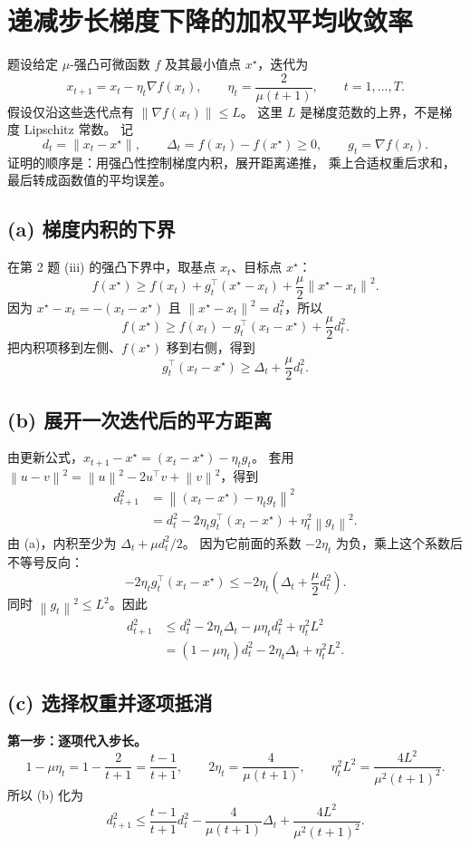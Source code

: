 \documentclass[UTF8,a4paper,11pt,fontset=fandol]{ctexart}
\newcommand{\norm}[1]{\left\lVert#1\right\rVert}
\begin{document}
\section{递减步长梯度下降的加权平均收敛率}
题设给定 $\mu$-强凸可微函数 $f$ 及其最小值点 $x^\star$，迭代为
\[
 x_{t+1}=x_t-\eta_t\nabla f(x_t),\qquad
 \eta_t=\frac2{\mu(t+1)},\qquad t=1,\ldots,T.
\]
假设仅沿这些迭代点有 $\norm{\nabla f(x_t)}\leq L$。
这里 $L$ 是梯度范数的上界，不是梯度 Lipschitz 常数。
记
\[
 d_t=\norm{x_t-x^\star},\qquad
 \Delta_t=f(x_t)-f(x^\star)\geq0,
 \qquad g_t=\nabla f(x_t).
\]
证明的顺序是：用强凸性控制梯度内积，展开距离递推，
乘上合适权重后求和，最后转成函数值的平均误差。

\subsection*{(a) 梯度内积的下界}
在第 2 题 (iii) 的强凸下界中，取基点 $x_t$、目标点 $x^\star$：
\[
 f(x^\star)\geq f(x_t)+g_t^\top(x^\star-x_t)
 +\frac\mu2\norm{x^\star-x_t}^2.
\]
因为 $x^\star-x_t=-(x_t-x^\star)$ 且
$\norm{x^\star-x_t}^2=d_t^2$，所以
\[
 f(x^\star)\geq f(x_t)-g_t^\top(x_t-x^\star)+\frac\mu2d_t^2.
\]
把内积项移到左侧、$f(x^\star)$ 移到右侧，得到
\[
 \boxed{g_t^\top(x_t-x^\star)\geq\Delta_t+\frac\mu2d_t^2.}
\]

\subsection*{(b) 展开一次迭代后的平方距离}
由更新公式，$x_{t+1}-x^\star=(x_t-x^\star)-\eta_tg_t$。
套用 $\norm{u-v}^2=\norm u^2-2u^\top v+\norm v^2$，得到
\begin{align*}
 d_{t+1}^2
 &=\norm{(x_t-x^\star)-\eta_tg_t}^2\\
 &=d_t^2-2\eta_tg_t^\top(x_t-x^\star)+\eta_t^2\norm{g_t}^2.
\end{align*}
由 (a)，内积至少为 $\Delta_t+\mu d_t^2/2$。
因为它前面的系数 $-2\eta_t$ 为负，乘上这个系数后不等号反向：
\[
 -2\eta_tg_t^\top(x_t-x^\star)
 \leq-2\eta_t\left(\Delta_t+\frac\mu2d_t^2\right).
\]
同时 $\norm{g_t}^2\leq L^2$。因此
\begin{align*}
 d_{t+1}^2
 &\leq d_t^2-2\eta_t\Delta_t-\mu\eta_td_t^2+\eta_t^2L^2\\
 &=\boxed{(1-\mu\eta_t)d_t^2-2\eta_t\Delta_t+\eta_t^2L^2}.
\end{align*}

\subsection*{(c) 选择权重并逐项抵消}
\textbf{第一步：逐项代入步长。}
\[
 1-\mu\eta_t=1-\frac2{t+1}=\frac{t-1}{t+1},\qquad
 2\eta_t=\frac4{\mu(t+1)},\qquad
 \eta_t^2L^2=\frac{4L^2}{\mu^2(t+1)^2}.
\]
所以 (b) 化为
\[
 d_{t+1}^2\leq\frac{t-1}{t+1}d_t^2
 -\frac4{\mu(t+1)}\Delta_t+\frac{4L^2}{\mu^2(t+1)^2}.
\]
\end{document}
